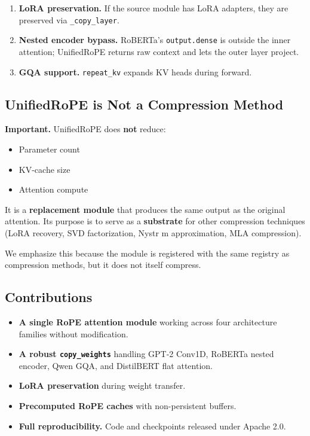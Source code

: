 {\begin{itemize}
\end{itemize}
\begin{enumerate}
\item \textbf{LoRA preservation.} If the source module has LoRA adapters, they
  are preserved via \texttt{\_copy\_layer}.

\item \textbf{Nested encoder bypass.} RoBERTa's \texttt{output.dense} is outside the inner
  attention; UnifiedRoPE returns raw context and lets the outer layer
  project.

\item \textbf{GQA support.} \texttt{repeat\_kv} expands KV heads during forward.

\end{enumerate}
\subsection{UnifiedRoPE is Not a Compression Method}

\textbf{Important.} UnifiedRoPE does \textbf{not} reduce:
\begin{itemize}
\item Parameter count
\item KV-cache size
\item Attention compute

\end{itemize}
It is a \textbf{replacement module} that produces the same output as the 
original attention. Its purpose is to serve as a \textbf{substrate} for other 
compression techniques (LoRA recovery, SVD factorization, Nystr m 
approximation, MLA compression).

We emphasize this because the module is registered with the same registry 
as compression methods, but it does not itself compress.

\subsection{Contributions}

\begin{itemize}
\item \textbf{A single RoPE attention module} working across four architecture
  families without modification.
\item \textbf{A robust \texttt{copy\_weights}} handling GPT-2 Conv1D, RoBERTa nested
  encoder, Qwen GQA, and DistilBERT flat attention.
\item \textbf{LoRA preservation} during weight transfer.
\item \textbf{Precomputed RoPE caches} with non-persistent buffers.
\item \textbf{Full reproducibility.} Code and checkpoints released under
  Apache 2.0.


\end{itemize}}
